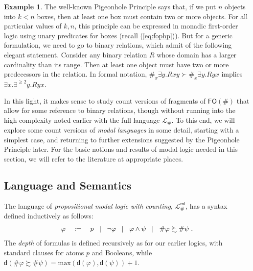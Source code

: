 \documentclass[12pt,oneside,reqno]{amsart}
\theoremstyle{definition}
\newtheorem{example}{Example}
\begin{document}
\begin{example} The well-known Pigeonhole Principle says that, if we put $n$ objects into $k < n$ boxes, then at least one box must contain two or more objects. For all particular values of $k, n$, this principle can be expressed in monadic first-order logic using unary predicates for boxes (recall (\ref{eq:fophp})). But for a generic formulation, we need to go to binary relations, which admit of the following elegant statement.  Consider any binary relation $R$ whose domain has a larger cardinality than its range. Then at least one object must have two or more predecessors in the relation. In formal notation, $\#_x\exists y. Rxy \succ \#_x\exists y. Ryx$ implies $\exists x. \exists^{\geq 2} y. Ryx$.
\end{example}

In this light, it makes sense to study count versions of  fragments of $\mathsf{FO}(\#)$ that allow for some reference to binary relations, though without running into the high complexity noted earlier with the full language $\mathcal{L}_\#$. To this end, we will explore some count versions  of {\it modal languages} in some detail, starting with a simplest case, and returning to further extensions suggested by the Pigeonhole Principle later. For the basic notions and results of modal logic needed in this section, we will refer to the literature at appropriate places.


\subsection{Language and Semantics}  The language of \emph{propositional modal logic with counting}, $\mathcal{L}_\#^{\mathsf{ml}}$, has a syntax defined inductively as follows:\vspace{0.1ex}
$$\varphi \quad :=  \quad p \;\; \mid \;\; \neg \varphi \;\; \mid \;\; \varphi \wedge \psi \;\;\mid \;\; \#\varphi \succsim \#\psi \;. \vspace{0.1ex}$$
The \emph{depth} of formulas is defined recursively as for our earlier logics, with standard clauses for atoms $p$ and Booleans, while $\mathsf{d}(\#\varphi \succsim  \#\psi) = \mbox{max}(\mathsf{d}(\varphi), \mathsf{d}(\psi)) + 1$.
\end{document}
